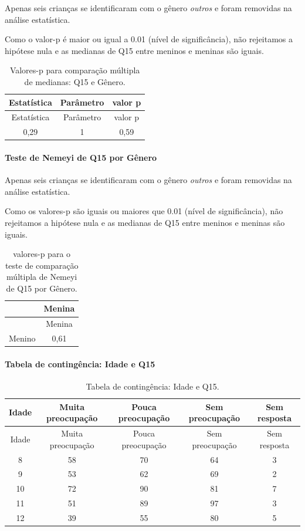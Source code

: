 \documentclass[]{article}
\let\oldparagraph\paragraph
\renewcommand{\paragraph}[1]{\oldparagraph{#1}\mbox{}}
\begin{document}
Apenas seis crianças se identificaram com o gênero \emph{outros} e foram removidas na análise estatística.

Como o valor-p é maior ou igual a 0.01 (nível de significância), não rejeitamos a hipótese nula e as medianas de Q15 entre meninos e meninas são iguais.

\begin{longtable}[]{@{}ccc@{}}
\caption{\label{tab:unnamed-chunk-89}Valores-p para comparação múltipla de medianas: Q15 e Gênero.}\tabularnewline
\toprule
Estatística & Parâmetro & valor p\tabularnewline
\midrule
\endfirsthead
\toprule
Estatística & Parâmetro & valor p\tabularnewline
\midrule
\endhead
0,29 & 1 & 0,59\tabularnewline
\bottomrule
\end{longtable}

\hypertarget{teste-de-nemeyi-de-q15-por-guxeanero}{%
\paragraph{Teste de Nemeyi de Q15 por Gênero}\label{teste-de-nemeyi-de-q15-por-guxeanero}}

Apenas seis crianças se identificaram com o gênero \emph{outros} e foram removidas na análise estatística.

Como os valores-p são iguais ou maiores que 0.01 (nível de significância), não rejeitamos a hipótese nula e as medianas de Q15 entre meninos e meninas são iguais.

\begin{longtable}[]{@{}lc@{}}
\caption{\label{tab:unnamed-chunk-91}valores-p para o teste de comparação múltipla de Nemeyi de Q15 por Gênero.}\tabularnewline
\toprule
& Menina\tabularnewline
\midrule
\endfirsthead
\toprule
& Menina\tabularnewline
\midrule
\endhead
Menino & 0,61\tabularnewline
\bottomrule
\end{longtable}

\cleardoublepage

\hypertarget{tabela-de-continguxeancia-idade-e-q15}{%
\paragraph{Tabela de contingência: Idade e Q15}\label{tabela-de-continguxeancia-idade-e-q15}}

\begin{longtable}[]{@{}ccccc@{}}
\caption{\label{tab:unnamed-chunk-92}Tabela de contingência: Idade e Q15.}\tabularnewline
\toprule
Idade & Muita preocupação & Pouca preocupação & Sem preocupação & Sem resposta\tabularnewline
\midrule
\endfirsthead
\toprule
Idade & Muita preocupação & Pouca preocupação & Sem preocupação & Sem resposta\tabularnewline
\midrule
\endhead
8 & 58 & 70 & 64 & 3\tabularnewline
9 & 53 & 62 & 69 & 2\tabularnewline
10 & 72 & 90 & 81 & 7\tabularnewline
11 & 51 & 89 & 97 & 3\tabularnewline
12 & 39 & 55 & 80 & 5\tabularnewline
\bottomrule
\end{longtable}
\end{document}
